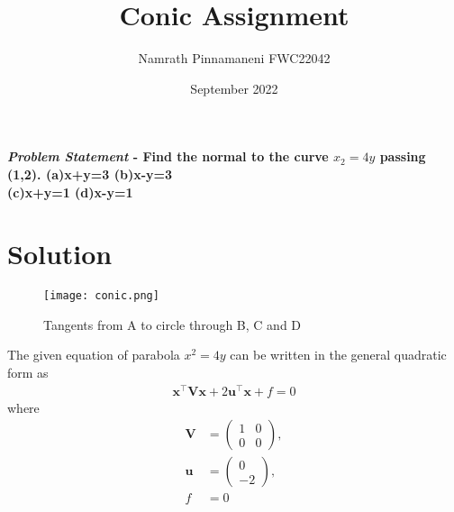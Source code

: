 \documentclass[journal,10pt,twocolumn]{article}
\title{\textbf{Conic Assignment}}
\author{Namrath Pinnamaneni \hspace{9cm} FWC22042}
\date{September 2022}
\let\vec\mathbf
\newcommand{\myvec}[1]{\ensuremath{\begin{pmatrix}#1\end{pmatrix}}}
\begin{document}
\maketitle
\paragraph{\textit{Problem Statement} -
\fi
Find the normal to the curve $x_2=4y$ passing (1,2). 
\iffalse
(a)x+y=3  \hspace{2cm} (b)x-y=3\\ 
(c)x+y=1 \hspace{2cm}  (d)x-y=1\\}

\section*{\large Solution}

\begin{figure}[H]
\centering
\texttt{[image: conic.png]}
\caption{Tangents from A to circle through B, C and D}
\label{fig:triangle}
\end{figure}

The given equation of parabola $x^2 = 4y$ can be written in the general quadratic form as
\begin{align}
    \label{eq:conic_quad_form}
    \vec{x}^{\top}\vec{V}\vec{x}+2\vec{u}^{\top}\vec{x}+f=0
    \end{align}
where
\begin{align}
	\label{eq:V_matrix}
	\vec{V} &= \myvec{1 & 0\\0 & 0},
	\\
	\label{eq:u_vector}
	\vec{u} &= \myvec{0\\-2},
	\\
	\label{eq:f_value}
	f &= 0
\end{align}
\end{document}
